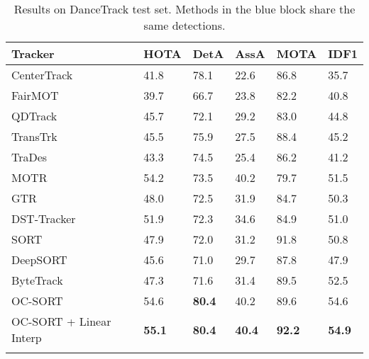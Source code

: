 \documentclass[10pt,twocolumn,letterpaper]{article}
\newcommand*{\aboverulesepcolor}[1]{\noalign{\begingroup 
      \color{#1}\hrule height\aboverulesep 
    \endgroup 
    \kern-\aboverulesep 
  }}
\begin{document}
\begin{table}[hbt!]
\centering
\caption{Results on DanceTrack test set. Methods in the \textcolor{babyblue}{blue} block share the same detections.}
\setlength{\tabcolsep}{7pt}
\scriptsize
\begin{tabular}{ l | p{2.2em}p{2.2em}p{2.2em}p{2.5em}p{2.5em}}

\toprule
Tracker & HOTA & DetA & AssA & MOTA & IDF1\\
\midrule
CenterTrack~\cite{centertrack} & 41.8 & 78.1 & 22.6 & 86.8 & 35.7 \\
FairMOT~\cite{zhang2021fairmot} & 39.7 & 66.7 & 23.8 & 82.2 & 40.8\\
QDTrack~\cite{pang2021quasi} & 45.7 & 72.1 & 29.2 & 83.0 & 44.8\\
TransTrk\cite{sun2020transtrack} & 45.5 & 75.9 & 27.5 & 88.4 & 45.2\\
TraDes~\cite{trades} & 43.3 & 74.5 & 25.4 & 86.2 & 41.2 \\ 
MOTR~\cite{zeng2022motr} & 54.2 & 73.5 & 40.2 & 79.7 & 51.5\\
GTR~\cite{zhou2022global} & 48.0 & 72.5 & 31.9 & 84.7 & 50.3 \\ 
DST-Tracker~\cite{dsttrack} & 51.9 & 72.3 & 34.6 & 84.9 & 51.0\\
\rowcolor{babyblue!20}SORT~\cite{bewley2016simple} & 47.9 & 72.0 & 31.2 & 91.8 & 50.8 \\
\rowcolor{babyblue!20}DeepSORT~\cite{deepsort} & 45.6 & 71.0 & 29.7 & 87.8 & 47.9\\
\rowcolor{babyblue!20}ByteTrack~\cite{bytetrack} & 47.3 & 71.6 & 31.4 & 89.5 & 52.5\\
\rowcolor{babyblue!20}OC-SORT & 54.6 & \textbf{80.4} & 40.2 & 89.6 & 54.6\\
\rowcolor{babyblue!20}OC-SORT + Linear Interp & \textbf{55.1} & \textbf{80.4} & \textbf{40.4} & \textbf{92.2} & \textbf{54.9}\\
\aboverulesepcolor{babyblue!20}
\bottomrule
\end{tabular}
\label{table:dancetrack}
\vspace{-0.5cm}
\end{table}
\end{document}
